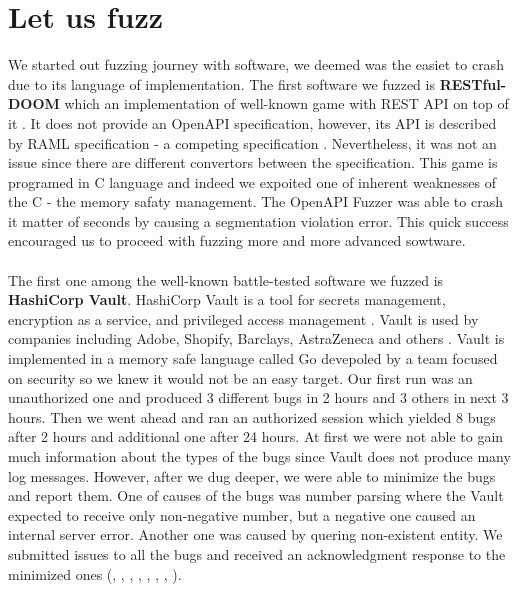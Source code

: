 \section{Let us fuzz}
We started out fuzzing journey with software, we deemed was the easiet to crash due to its language of implementation. The first software we fuzzed is \textbf{RESTful-DOOM} which an implementation of well-known game with REST API on top of it \cite{doom2020github}. It does not provide an OpenAPI specification, however, its API is described by RAML specification - a competing specification \cite{raml2020web}. Nevertheless, it was not an issue since there are different convertors between the specification. This game is programed in C language and indeed we expoited one of inherent weaknesses of the C - the memory safaty management. The OpenAPI Fuzzer was able to crash it matter of seconds by causing a segmentation violation error. This quick success encouraged us to proceed with fuzzing more and more advanced sowtware.

\paragraph{}
The first one among the well-known battle-tested software we fuzzed is \textbf{HashiCorp Vault}. HashiCorp Vault is a tool for secrets management, encryption as a service, and privileged access management \cite{vault2020github}. Vault is used by companies including Adobe, Shopify, Barclays, AstraZeneca and others \cite{vault2021web}. Vault is implemented in a memory safe language called Go devepoled by a team focused on security so we knew it would not be an easy target. Our first run was an unauthorized one and produced 3 different bugs in 2 hours and 3 others in next 3 hours. Then we went ahead and ran an authorized session which yielded 8 bugs after 2 hours and additional one after 24 hours. At first we were not able to gain much information about the types of the bugs since Vault does not produce many log messages. However, after we dug deeper, we were able to minimize the bugs and report them. One of causes of the bugs was number parsing where the Vault expected to receive only non-negative number, but a negative one caused an internal server error. Another one was caused by quering non-existent entity. We submitted issues to all the bugs and received an acknowledgment response to the minimized ones (\cite{vaultissue11304github}, \cite{vaultissue11306github}, \cite{vaultissue11308github}, \cite{vaultissue11310github}, \cite{vaultissue11311github}, \cite{vaultissue11313github}, \cite{vaultissue11314github}, \cite{vaultissue11315github}).

